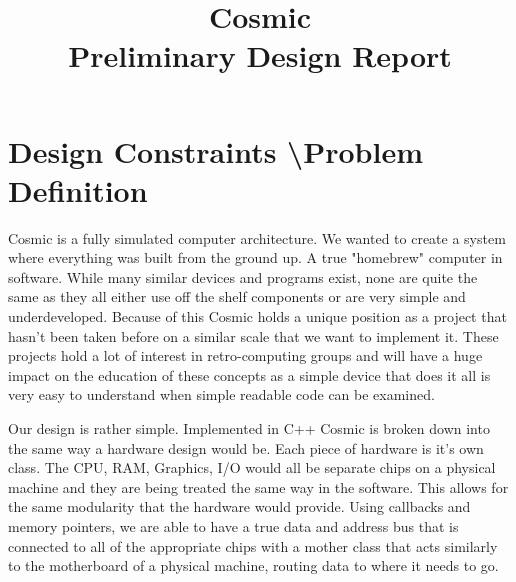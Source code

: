 \documentclass[conference]{IEEEtran}
\begin{document}
\title{
 Cosmic\\Preliminary Design Report}

\author{
\and
{}

}

\maketitle

\section{Design Constraints \textbackslash Problem Definition}

Cosmic is a fully simulated computer architecture. We wanted to create a system where everything was built from the ground up. A true "homebrew" computer  in software. While many similar devices and programs exist, none are quite the same as they all either use off the shelf components or are very simple and underdeveloped. Because of this Cosmic holds a unique position as a project that hasn't been taken before on a similar scale that we want to implement it. These projects hold a lot of interest in retro-computing groups and will have a huge impact on the education of these concepts as a simple device that does it all is very easy to understand when simple readable code can be examined. 

Our design is rather simple. Implemented in C++ Cosmic is broken down into the same way a hardware design would be. Each piece of hardware is it's own class. The CPU, RAM, Graphics, I/O would all be separate chips on a physical machine and they are being treated the same way in the software. This allows for the same modularity that the hardware would provide. Using callbacks and memory pointers, we are able to have a true data and address bus that is connected to all of the appropriate chips with a mother class that acts similarly to the motherboard of a physical machine, routing data to where it needs to go. 
\end{document}
